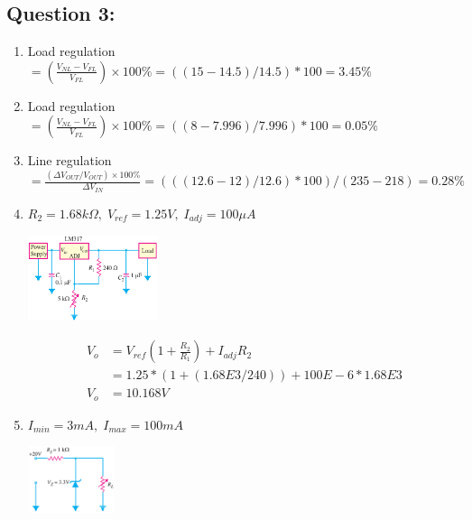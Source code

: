 \documentclass[11pt]{article}
\begin{document}
\begin{preview}
\section*{Question 3:}
\begin{enumerate}[label=\alph*)]
          \item Load regulation $=(\frac{V_{NL} - V_{FL}}{V_{FL}})\times 100\% = ((15-14.5)/14.5)*100=3.45\%$
          \item Load regulation $=(\frac{V_{NL} - V_{FL}}{V_{FL}})\times 100\% = ((8-7.996)/7.996)*100=0.05\%$
          \item Line regulation $=\frac{(\Delta V_{OUT} / V_{OUT})\times 100\%}{\Delta V_{IN}} = (((12.6-12)/12.6)*100)/(235-218)=0.28\%$ 
          \item $R_{2} = 1.68k\Omega, \; V_{ref} = 1.25V, \; I_{adj} = 100\mu A$
          \begin{center}
            \includegraphics[width=0.3\textwidth]{q3_fig1.png}
          \end{center}

          \begin{align*}
            V_o &= V_{ref}(1+\frac{R_2}{R_1}) + I_{adj}R_2 \\
                &= 1.25*(1 + (1.68E3 / 240)) + 100E-6*1.68E3 \\
            V_o &= 10.168V
          \end{align*}
          
          \item $I_{min} = 3mA, \; I_{max} = 100mA$
          \begin{center}
            \includegraphics[width=0.2\textwidth]{q3_fig2.png}
          \end{center}


\end{enumerate}
\end{preview}
\end{document}
